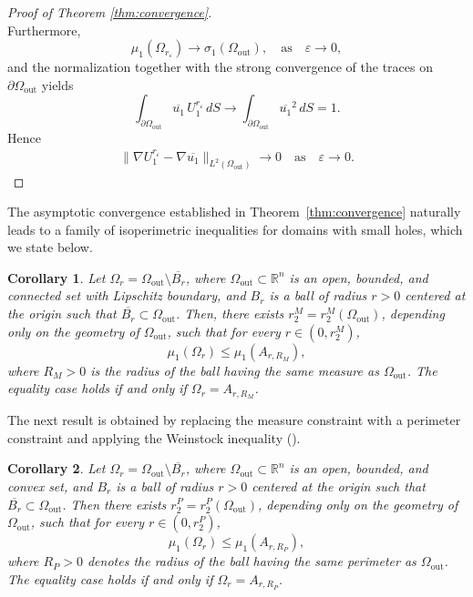 \documentclass[12pt,reqno]{amsart}
\newtheorem{cor}{Corollary}[section]
\numberwithin{equation}{section}
\numberwithin{theorem}{section}
\numberwithin{equation}{section}
\numberwithin{theorem}{section}
\begin{document}
\begin{proof}[Proof of Theorem \ref{thm:convergence}]
\begin{equation*}
\end{equation*}
Furthermore,  $$\mu_1( \Omega_{r_\varepsilon}) \to \sigma_1( \Omega_{\mathrm{out}}), \quad\text{as} \quad \varepsilon\to 0, $$
and the normalization together with the strong convergence of the traces on $\partial \Omega_{\mathrm{out}}$ yields
$$ \int_{ \partial \Omega_{\mathrm{out}}}  \overline{u_1} \,  U_1^{r_\varepsilon} \, dS \to  \int_{ \partial \Omega_{\mathrm{out}}}  \overline{u_1} ^2\, dS=1.$$ 
Hence
\begin{align*}
     \|\nabla U_1^{r_\varepsilon}-\nabla \overline{u_1}\|_{L^2(\Omega_{\mathrm{out}})} \to 0 \quad \text{as} \quad \varepsilon \to 0.
\end{align*}
\end{proof}

The asymptotic convergence established in Theorem~\ref{thm:convergence}
naturally leads to a family of isoperimetric inequalities for domains with
small holes, which we state below.

\begin{cor}\label{thm:isoperimetric1}
Let $\Omega_r = \Omega_{\mathrm{out}} \setminus \overline{B_r}$, where
$\Omega_{\mathrm{out}} \subset \mathbb{R}^n$ is an open, bounded, and
connected set with Lipschitz boundary, and $B_r$ is a ball of radius $r>0$
centered at the origin such that $\overline{B_r} \subset \Omega_{\mathrm{out}}$.
Then, there exists $r_2^M = r_2^M(\Omega_{\mathrm{out}})$, depending only on
the geometry of $\Omega_{\mathrm{out}}$, such that for every
$r \in (0, r_2^M)$,
\begin{equation}\label{eq:isopsecondSD}
\mu_1(\Omega_r) \le \mu_1(A_{r,R_M}),
\end{equation}
where $R_M > 0$ is the radius of the ball having the same measure as
$\Omega_{\mathrm{out}}$. The equality case holds if and only if $\Omega_r = A_{r,R_M}$.
\end{cor}

The next result is obtained by replacing the measure constraint with a
perimeter constraint and applying the Weinstock inequality (\cite{BFNT2021}).

\begin{cor}\label{thm:isoperimetric2}
Let $\Omega_r = \Omega_{\mathrm{out}} \setminus \overline{B_r}$, where
$\Omega_{\mathrm{out}} \subset \mathbb{R}^n$ is an open, bounded, and convex
set, and $B_r$ is a ball of radius $r>0$ centered at the origin such that
$\overline{B_r} \subset \Omega_{\mathrm{out}}$.
Then there exists $r_2^P = r_2^P(\Omega_{\mathrm{out}})$, depending only on
the geometry of $\Omega_{\mathrm{out}}$, such that for every
$r \in (0, r_2^P)$,
\begin{equation}\label{eq:isopsecondSDP}
\mu_1(\Omega_r) \le \mu_1(A_{r,R_P}),
\end{equation}
where $R_P > 0$ denotes the radius of the ball having the same perimeter as
$\Omega_{\mathrm{out}}$. The equality case holds if and only if $\Omega_r = A_{r,R_P}$.
\end{cor}
\end{document}
